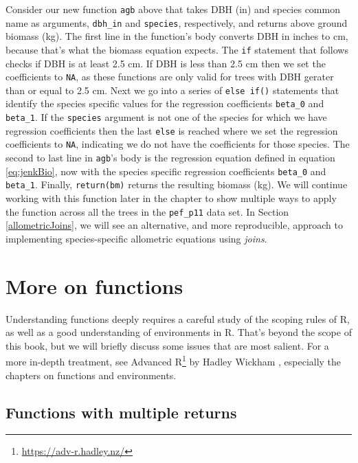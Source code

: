 \documentclass[
  11pt,
]{krantz}
\renewcommand{\href}[2]{#2\footnote{\url{#1}}}
\theoremstyle{definition}
\theoremstyle{definition}
\theoremstyle{definition}
\theoremstyle{definition}
\theoremstyle{remark}
\begin{document}
Consider our new function \texttt{agb} above that takes DBH (in) and species common name as arguments, \texttt{dbh\_in} and \texttt{species}, respectively, and returns above ground biomass (kg). The first line in the function's body converts DBH in inches to cm, because that's what the \citet{jenkins03} biomass equation expects. The \texttt{if} statement that follows checks if DBH is at least 2.5 cm. If DBH is less than 2.5 cm then we set the coefficients to \texttt{NA}, as these functions are only valid for trees with DBH gerater than or equal to 2.5 cm. Next we go into a series of \texttt{else\ if()} statements that identify the species specific values for the regression coefficients \texttt{beta\_0} and \texttt{beta\_1}. If the \texttt{species} argument is not one of the species for which we have regression coefficients then the last \texttt{else} is reached where we set the regression coefficients to \texttt{NA}, indicating we do not have the coefficients for those species. The second to last line in \texttt{agb}'s body is the regression equation defined in equation \eqref{eq:jenkBio}, now with the species specific regression coefficients \texttt{beta\_0} and \texttt{beta\_1}. Finally, \texttt{return(bm)} returns the resulting biomass (kg). We will continue working with this function later in the chapter to show multiple ways to apply the function across all the trees in the \texttt{pef\_p11} data set. In Section \ref{allometricJoins}, we will see an alternative, and more reproducible, approach to implementing species-specific allometric equations using \emph{joins}.

\hypertarget{more-on-functions}{%
\section{More on functions}\label{more-on-functions}}

Understanding functions deeply requires a careful study of the scoping rules of R, as well as a good understanding of environments in R. That's beyond the scope of this book, but we will briefly discuss some issues that are most salient. For a more in-depth treatment, see \href{https://adv-r.hadley.nz/}{Advanced R} by Hadley Wickham \citep{whickam2019advanced}, especially the chapters on functions and environments.

\hypertarget{functions-with-multiple-returns}{%
\subsection{Functions with multiple returns}\label{functions-with-multiple-returns}}
\end{document}
